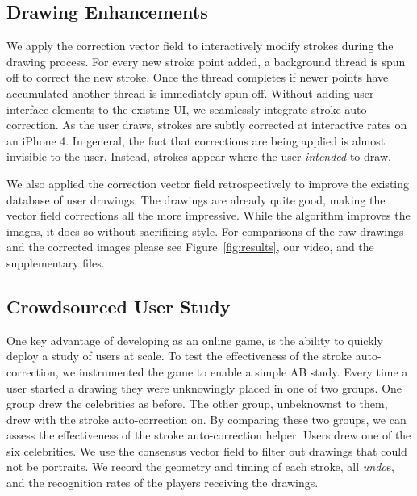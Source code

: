 \subsection {Drawing Enhancements}

We apply the correction vector field to interactively modify strokes during the drawing process. For every new stroke point added, a background thread is spun off to correct the new stroke. Once the thread completes if newer points have accumulated another thread is immediately spun off. Without adding user interface elements to the existing \daf UI, we seamlessly integrate stroke auto-correction. As the user draws, strokes are subtly corrected at interactive rates on an iPhone 4. In general, the fact that corrections are being applied is almost invisible to the user. Instead, strokes appear where the user {\em intended} to draw.


We also applied the correction vector field retrospectively to improve the existing database of user drawings. The drawings are already quite good, making the vector field corrections all the more impressive.  While the algorithm improves the images, it does so without sacrificing style. For comparisons of the raw drawings and the corrected images please see Figure~\ref{fig:results}, our video, and the supplementary files.

\subsection {Crowdsourced User Study}

One key advantage of developing \daf as an online game, is the ability to quickly deploy a study of users at scale. To test the effectiveness of the stroke auto-correction, we instrumented the game to enable a simple AB study. Every time a user started a drawing they were unknowingly placed in one of two groups. One group drew the celebrities as before. The other group, unbeknownst to them, drew with the stroke auto-correction on. By comparing these two groups, we can assess the effectiveness of the stroke auto-correction helper. Users drew one of the six celebrities. We use the consensus vector field to filter out drawings that could not be portraits. We record the geometry and timing of each stroke, all {\em undo}s, and the recognition rates of the players receiving the drawings.

